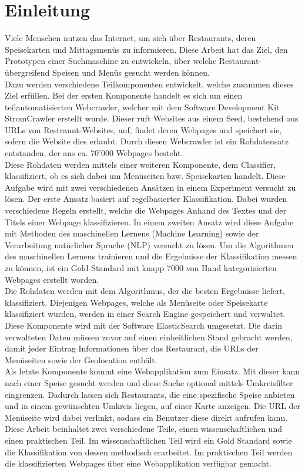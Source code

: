 \chapter{Einleitung}
Viele Menschen nutzen das Internet, um sich über Restaurants, deren Speisekarten und Mittagsmenüs zu informieren.
Diese Arbeit hat das Ziel, den Prototypen einer Suchmaschine zu entwickeln, über welche Restaurant-übergreifend Speisen und Menüs gesucht werden können.\\
Dazu werden verschiedene Teilkomponenten entwickelt, welche zusammen dieses Ziel erfüllen.
Bei der ersten Komponente handelt es sich um einen teilautomatisierten Webcrawler, welcher mit dem Software Development Kit \glqq StromCrawler\grqq{} erstellt wurde.
Dieser ruft Websites aus einem Seed, bestehend aus URLs von Restraunt-Websites, auf, findet deren Webpages  und speichert sie, sofern die Website dies erlaubt.
Durch diesen Webcrawler ist ein Rohdatensatz entstanden, der aus ca. 70'000 Webpages besteht.\\
Diese Rohdaten werden mittels einer weiteren Komponente, dem Classifier, klassifiziert, ob es sich dabei um Menüseiten bzw. Speisekarten handelt.
Diese Aufgabe wird mit zwei verschiedenen Ansätzen in einem Experiment versucht zu lösen.
Der erste Ansatz basiert auf regelbasierter Klassifikation.
Dabei wurden verschiedene Regeln erstellt, welche die Webpages Anhand des Textes und der Titels einer Webpage klassifizieren.
In einem zweiten Ansatz wird diese Aufgabe mit Methoden des maschinellen Lernens (Machine Learning) sowie der Verarbeitung natürlicher Sprache (NLP) versucht zu lösen.
Um die Algorithmen des maschinellen Lernens trainieren und die Ergebnisse der Klassifikation messen zu können, ist ein Gold Standard mit knapp 7000 von Hand kategorisierten Webpages erstellt worden.\\
Die Rohdaten werden mit dem Algorithmus, der die besten Ergebnisse liefert, klassifiziert.
Diejenigen Webpages, welche als Menüseite oder Speisekarte klassifiziert wurden, werden in einer Search Engine gespeichert und verwaltet.
Diese Komponente wird mit der Software ElasticSearch umgesetzt.
Die darin verwalteten Daten müssen zuvor auf einen einheitlichen Stand gebracht werden, damit jeder Eintrag Informationen über das Restaurant, die URLs der Menüseiten sowie der Geolocation enthält.\\
Als letzte Komponente kommt eine Webapplikation zum Einsatz. 
Mit dieser kann nach einer Speise gesucht werden und diese Suche optional mittels Umkreisfilter eingrenzen.
Dadurch lassen sich Restaurants, die eine spezifische Speise anbieten und in einem gewünschten Umkreis liegen, auf einer Karte anzeigen.
Die URL der Menüseite wird dabei verlinkt, sodass ein Benutzer diese direkt aufrufen kann.\\
Diese Arbeit beinhaltet zwei verschiedene Teile, einen wissenschaftlichen und einen praktischen Teil.
Im wissenschaftlichen Teil wird ein Gold Standard sowie die Klassifikation von dessen methodisch erarbeitet.
Im praktischen Teil werden die klassifizierten Webpages über eine Webapplikation verfügbar gemacht.